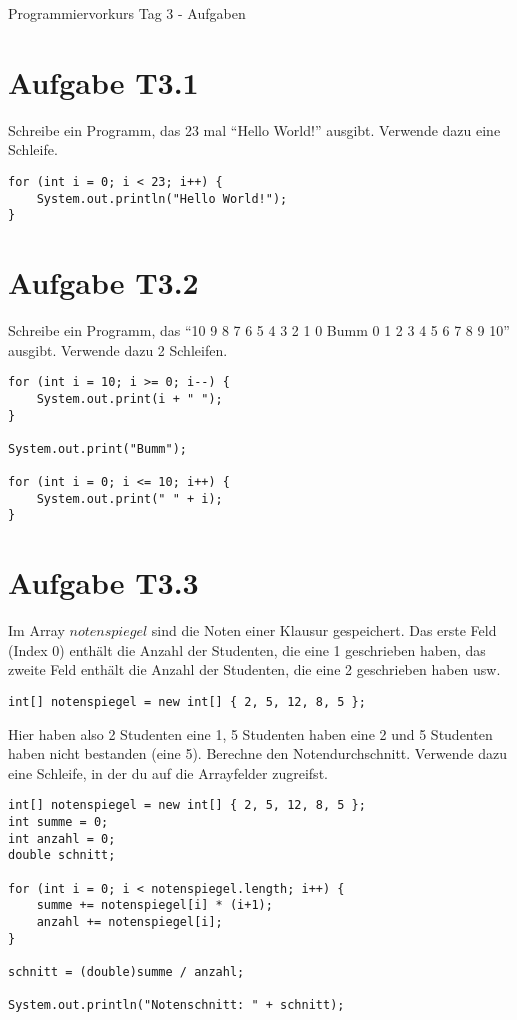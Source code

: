 \documentclass[final,a4paper]{article}
\begin{document}


{\huge Programmiervorkurs Tag 3 - Aufgaben}

\bigskip

\section*{Aufgabe T3.1}
Schreibe ein Programm, das 23 mal "`Hello World!"' ausgibt. Verwende dazu eine Schleife.

\begin{lstlisting}
for (int i = 0; i < 23; i++) {
	System.out.println("Hello World!");
}
\end{lstlisting}

\section*{Aufgabe T3.2}
Schreibe ein Programm, das "`10 9 8 7 6 5 4 3 2 1 0 Bumm 0 1 2 3 4 5 6 7 8 9 10"' ausgibt.
Verwende dazu 2 Schleifen.

\begin{lstlisting}
for (int i = 10; i >= 0; i--) {
	System.out.print(i + " ");
}

System.out.print("Bumm");

for (int i = 0; i <= 10; i++) {
	System.out.print(" " + i);
}
\end{lstlisting}

\section*{Aufgabe T3.3}
Im Array $notenspiegel$ sind die Noten einer Klausur gespeichert. Das erste Feld (Index $0$)
enthält die Anzahl der Studenten, die eine 1 geschrieben haben, das zweite Feld enthält
die Anzahl der Studenten, die eine 2 geschrieben haben usw.
\begin{lstlisting}
int[] notenspiegel = new int[] { 2, 5, 12, 8, 5 };
\end{lstlisting}
Hier haben also 2 Studenten eine 1, 5 Studenten haben eine 2 und 5 Studenten haben nicht bestanden (eine 5).
Berechne den Notendurchschnitt. Verwende dazu eine Schleife, in der du auf die
Arrayfelder zugreifst.

\begin{lstlisting}
int[] notenspiegel = new int[] { 2, 5, 12, 8, 5 };
int summe = 0;
int anzahl = 0;
double schnitt;

for (int i = 0; i < notenspiegel.length; i++) {
	summe += notenspiegel[i] * (i+1);
	anzahl += notenspiegel[i];
}

schnitt = (double)summe / anzahl;

System.out.println("Notenschnitt: " + schnitt);
\end{lstlisting}
\end{document}

